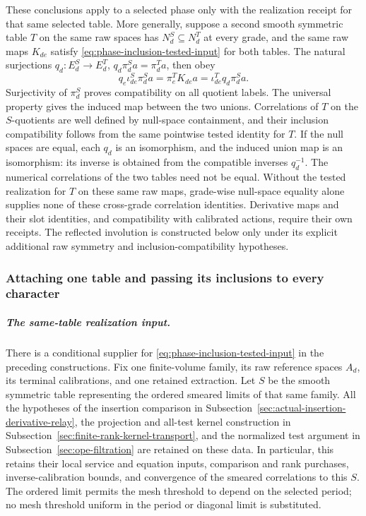 These conclusions apply to a selected phase only with the realization
receipt for that same selected table. More generally, suppose a second
smooth symmetric table $T$ on the same raw spaces has
$N_d^S\subseteq N_d^T$ at every grade, and the same raw maps $K_{de}$
satisfy \eqref{eq:phase-inclusion-tested-input} for both tables. The natural
surjections $q_d:E_d^S\to E_d^T$, $q_d\pi_d^Sa=\pi_d^Ta$, then obey
\[
 q_e\iota_{de}^S\pi_d^Sa=\pi_e^TK_{de}a
             =\iota_{de}^Tq_d\pi_d^Sa.
\]
Surjectivity of $\pi_d^S$ proves compatibility on all quotient labels.
The universal property gives the induced map between the two unions.
Correlations of $T$ on the $S$-quotients are well defined by null-space
containment, and their inclusion compatibility follows from the same
pointwise tested identity for $T$. If the null spaces are equal, each
$q_d$ is an isomorphism, and the induced union map is an isomorphism:
its inverse is obtained from the compatible inverses $q_d^{-1}$.
The numerical correlations of the two tables need not be equal.
Without the tested realization for $T$ on these same raw maps, grade-wise
null-space equality alone supplies none of these cross-grade correlation
identities. Derivative maps and their slot identities, and compatibility
with calibrated actions, require their own receipts. The reflected
involution is constructed below only under its explicit additional
raw symmetry and inclusion-compatibility hypotheses.

\subsubsection{Attaching one table and passing its inclusions to every character}
\label{subsec:phase-inclusion-inheritance}

\subparagraph{The same-table realization input.}
\label{par:phase-inclusion-attachment}
There is a conditional supplier for
\eqref{eq:phase-inclusion-tested-input} in the preceding constructions.
Fix one finite-volume family, its raw reference spaces $A_d$, its terminal
calibrations, and one retained extraction. Let $S$ be the smooth symmetric
table representing the ordered smeared limits of that same family. All the
hypotheses of the insertion comparison in
Subsection~\ref{sec:actual-insertion-derivative-relay}, the projection and
all-test kernel construction in
Subsection~\ref{sec:finite-rank-kernel-transport}, and the normalized test
argument in Subsection~\ref{sec:ope-filtration} are retained on these data.
In particular, this retains their local service and equation inputs,
comparison and rank purchases, inverse-calibration bounds, and convergence
of the smeared correlations to this $S$. The ordered limit permits the
mesh threshold to depend on the selected period; no mesh threshold uniform in the period
or diagonal limit is substituted.

